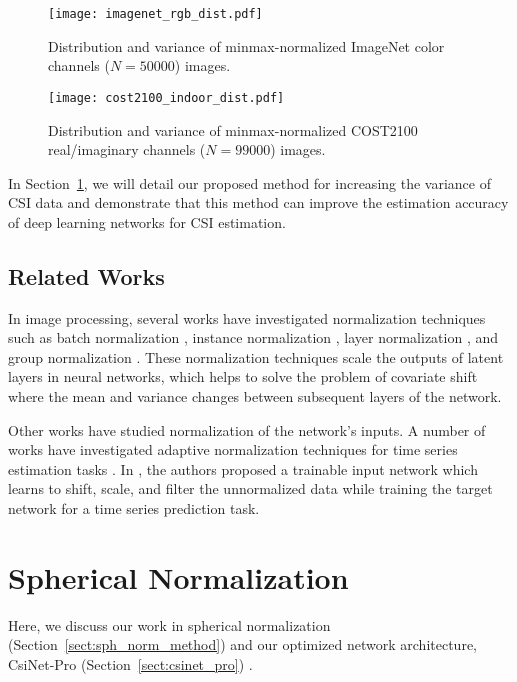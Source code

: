 \begin{figure}[htb]
	\centering
	\texttt{[image: imagenet\_rgb\_dist.pdf]}
	\medskip
	\caption{Distribution and variance of minmax-normalized ImageNet color channels ($N=50000$) images.}
	\label{fig:imagenet_dist}
\end{figure}

\begin{figure}[htb]
	\centering
	\texttt{[image: cost2100\_indoor\_dist.pdf]}
	\medskip
	\caption{Distribution and variance of minmax-normalized COST2100 real/imaginary channels ($N=99000$) images.}
	\label{fig:cost_indoor_dist}
\end{figure}

In Section~\ref{sect:sph_norm}, we  will detail our proposed method for increasing the variance of CSI data and demonstrate that this method can improve the estimation accuracy of deep learning networks for CSI estimation.

\subsection{Related Works}

In image processing, several works have investigated normalization techniques such as batch normalization \cite{ref:ioffe2015batch}, instance normalization \cite{ref:huang2017instance}, layer normalization \cite{ref:ba2016layer}, and group normalization \cite{ref:wu2018group}. These normalization techniques scale the outputs of latent layers in neural networks, which helps to solve the problem of covariate shift \cite{ref:ioffe2015batch} where the mean and variance changes between subsequent layers of the network.

Other works have studied normalization of the network's inputs. A number of works have investigated adaptive normalization techniques for time series estimation tasks \cite{ref:ogasawara2010adaptive, ref:nayak2014impact, ref:shao2015self}. In \cite{ref:passalis2019dain}, the authors proposed a trainable input network which learns to shift, scale, and filter the unnormalized data while training the target network for a time series prediction task.

\section{Spherical Normalization} \label{sect:sph_norm}

Here, we discuss our work in spherical normalization (Section~\ref{sect:sph_norm_method}) and our optimized network architecture, CsiNet-Pro (Section~\ref{sect:csinet_pro}) \cite{ref:liu2020sphnet}.

